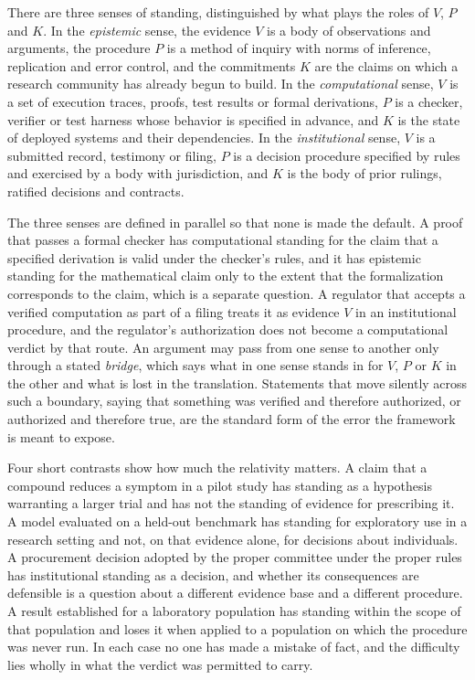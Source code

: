 There are three senses of standing, distinguished by what plays the roles of $V$, $P$ and $K$. In the \emph{epistemic} sense, the evidence $V$ is a body of observations and arguments, the procedure $P$ is a method of inquiry with norms of inference, replication and error control, and the commitments $K$ are the claims on which a research community has already begun to build. In the \emph{computational} sense, $V$ is a set of execution traces, proofs, test results or formal derivations, $P$ is a checker, verifier or test harness whose behavior is specified in advance, and $K$ is the state of deployed systems and their dependencies. In the \emph{institutional} sense, $V$ is a submitted record, testimony or filing, $P$ is a decision procedure specified by rules and exercised by a body with jurisdiction, and $K$ is the body of prior rulings, ratified decisions and contracts.

The three senses are defined in parallel so that none is made the default. A proof that passes a formal checker has computational standing for the claim that a specified derivation is valid under the checker's rules, and it has epistemic standing for the mathematical claim only to the extent that the formalization corresponds to the claim, which is a separate question. A regulator that accepts a verified computation as part of a filing treats it as evidence $V$ in an institutional procedure, and the regulator's authorization does not become a computational verdict by that route. An argument may pass from one sense to another only through a stated \emph{bridge}, which says what in one sense stands in for $V$, $P$ or $K$ in the other and what is lost in the translation. Statements that move silently across such a boundary, saying that something was verified and therefore authorized, or authorized and therefore true, are the standard form of the error the framework is meant to expose.

Four short contrasts show how much the relativity matters. A claim that a compound reduces a symptom in a pilot study has standing as a hypothesis warranting a larger trial and has not the standing of evidence for prescribing it. A model evaluated on a held-out benchmark has standing for exploratory use in a research setting and not, on that evidence alone, for decisions about individuals. A procurement decision adopted by the proper committee under the proper rules has institutional standing as a decision, and whether its consequences are defensible is a question about a different evidence base and a different procedure. A result established for a laboratory population has standing within the scope of that population and loses it when applied to a population on which the procedure was never run. In each case no one has made a mistake of fact, and the difficulty lies wholly in what the verdict was permitted to carry.


